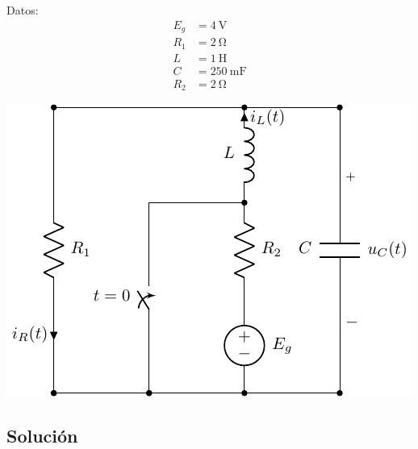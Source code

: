 \documentclass[12pt]{article}
\begin{document}
\begin{minipage}{0.3\textwidth}
Datos:
\begin{align*}
  E_g &= \SI{4}{\volt}\\
  R_1&= \SI{2}{\ohm}\\
  L &= \SI{1}{\henry}\\
  C &= \SI{250}{\milli\farad}\\
  R_2 &= \SI{2}{\ohm}
\end{align*}
\end{minipage}
\begin{minipage}{0.7\textwidth}
\includegraphics{figs/E2_circuito_v2.pdf}
\end{minipage}

\subsection*{Solución}
\end{document}
